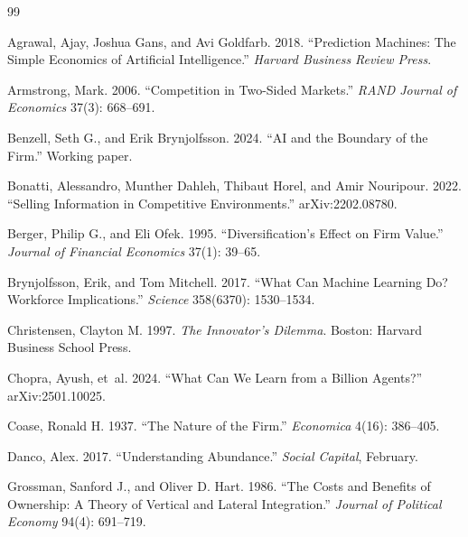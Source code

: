 \documentclass[12pt]{article}
\theoremstyle{definition}
\begin{document}



\begin{thebibliography}{99}

Agrawal, Ajay, Joshua Gans, and Avi Goldfarb. 2018. ``Prediction Machines: The Simple Economics of Artificial Intelligence.'' \textit{Harvard Business Review Press}.

Armstrong, Mark. 2006. ``Competition in Two-Sided Markets.'' \textit{RAND Journal of Economics} 37(3): 668--691.

Benzell, Seth G., and Erik Brynjolfsson. 2024. ``AI and the Boundary of the Firm.'' Working paper.

Bonatti, Alessandro, Munther Dahleh, Thibaut Horel, and Amir Nouripour. 2022. ``Selling Information in Competitive Environments.'' arXiv:2202.08780.

Berger, Philip G., and Eli Ofek. 1995. ``Diversification's Effect on Firm Value.'' \textit{Journal of Financial Economics} 37(1): 39--65.

Brynjolfsson, Erik, and Tom Mitchell. 2017. ``What Can Machine Learning Do? Workforce Implications.'' \textit{Science} 358(6370): 1530--1534.

Christensen, Clayton M. 1997. \textit{The Innovator's Dilemma}. Boston: Harvard Business School Press.

Chopra, Ayush, et~al. 2024. ``What Can We Learn from a Billion Agents?'' arXiv:2501.10025.

Coase, Ronald H. 1937. ``The Nature of the Firm.'' \textit{Economica} 4(16): 386--405.

Danco, Alex. 2017. ``Understanding Abundance.'' \textit{Social Capital}, February.

Grossman, Sanford J., and Oliver D. Hart. 1986. ``The Costs and Benefits of Ownership: A Theory of Vertical and Lateral Integration.'' \textit{Journal of Political Economy} 94(4): 691--719.


\end{thebibliography}
\end{document}
